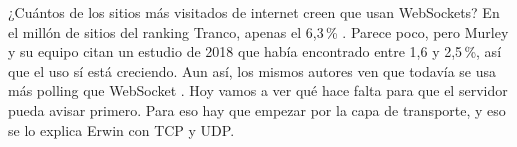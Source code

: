 ¿Cuántos de los sitios más visitados de internet creen que usan WebSockets? En el millón de sitios del
ranking Tranco, apenas el 6,3\,\% \cite[p.~1195]{Murley2021}.
Parece poco, pero Murley y su equipo citan un estudio de 2018 que había encontrado entre 1,6 y 2,5\,\%,
así que el uso sí está creciendo. Aun así, los mismos autores ven que todavía se usa más polling que WebSocket
\cite[p.~1195]{Murley2021}.
Hoy vamos a ver qué hace falta para que el servidor pueda avisar primero. Para eso hay que empezar por
la capa de transporte, y eso se lo explica Erwin con TCP y UDP.
